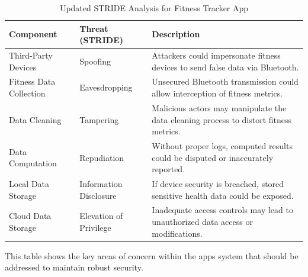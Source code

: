 \begin{table}[H]
    \centering

    \begin{tabular}{ | m{4.3cm} | m{2.5cm} | m{9cm} | }
        \hline
        \rowcolor{gray!50}
        \textbf{Component}      & \textbf{Threat (STRIDE)} & \textbf{Description}                                                                  \\
        \hline
        Third-Party Devices     & Spoofing                 & Attackers could impersonate fitness devices to send false data via Bluetooth.         \\
        \hline
        Fitness Data Collection & Eavesdropping            & Unsecured Bluetooth transmission could allow interception of fitness metrics.         \\
        \hline
        Data Cleaning           & Tampering                & Malicious actors may manipulate the data cleaning process to distort fitness metrics. \\
        \hline
        Data Computation        & Repudiation              & Without proper logs, computed results could be disputed or inaccurately reported.     \\
        \hline
        Local Data Storage      & Information Disclosure   & If device security is breached, stored sensitive health data could be exposed.        \\
        \hline
        Cloud Data Storage      & Elevation of Privilege   & Inadequate access controls may lead to unauthorized data access or modifications.     \\
        \hline
    \end{tabular}
    \caption{Updated STRIDE Analysis for Fitness Tracker App}
    \label{stride-analysis}
\end{table}
This table shows the key areas of concern within the apps system that should be addressed to maintain robust security.
